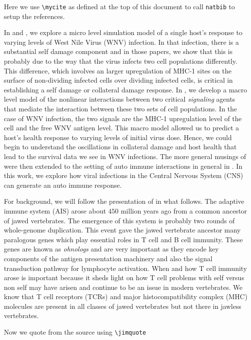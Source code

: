 \documentclass[11pt]{SelfArxOneColBMN}
\begin{document}
\onehalfspacing
\lstset{fancyvrb=false}

\noindent
Here we use \verb+\mycite+ as defined at the top of this document
to call \verb+natbib+ to setup the references.

In  and , we explore a micro
level simulation model of a single host's response to varying levels of
West Nile Virus (WNV) infection.  In that infection, there is a substantial
self damage component and in those papers, we show that
this is probably due to the way that the virus infects two
cell populations differently.  This difference, which involves
an larger upregulation of MHC-1 sites on the surface
of non-dividing infected cells over dividing infected cells,
is critical in establishing a self damage or collateral damage response.
In , we develop a macro level model
of the nonlinear interactions between two critical \emph{signaling}
agents that mediate the interaction between these two sets of cell populations.
In the case of WNV infection, the two signals are the MHC-1 upregulation level
of the cell and the free WNV antigen level.  This macro model allowed
us to predict a host's health response to varying levels of initial virus dose.
Hence, we could begin to understand the oscillations in collateral damage
and host health that lead to the survival data we see in WNV infections.
The more general musings of  were then 
extended to the setting of auto immune interactions in general
in .  In this work, we explore how viral infections
in the Central Nervous System (CNS) can generate an auto immune
response.

For background, we will follow the presentation of 
in what follows.
The adaptive immune system (AIS) arose about $450$ million years ago
from a common ancestor of jawed vertebrates.  The emergence of this system
is probably two rounds of whole-genome duplication.  This event gave the jawed
vertebrate ancestor many paralogous genes which play essential roles
in T cell and B cell immunity.  These genes are known as \emph{ohnologs}
and are very important as they encode key components of the antigen
presentation machinery and also the signal transduction pathway for
lymphocyte activation.  When and how T cell immunity arose is important
because it sheds light on how T cell problems with self versus non self may have arisen
and continue to be an issue in modern vertebrates.  We know that
T cell receptors (TCRs) and major histocompatibility complex (MHC) molecules
are present in all classes of jawed vertebrates but not there in jawless vertebrates.

Now we quote from the source  using \verb+\jimquote+


		
\end{document}
